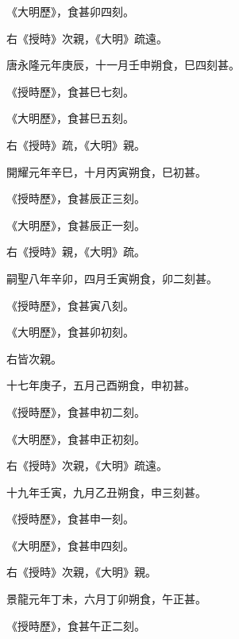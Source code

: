 \begin{pinyinscope}
 《大明歷》，食甚卯四刻。



 右《授時》次親，《大明》疏遠。



 唐永隆元年庚辰，十一月壬申朔食，巳四刻甚。



 《授時歷》，食甚巳七刻。



 《大明歷》，食甚巳五刻。



 右《授時》疏，《大明》親。



 開耀元年辛巳，十月丙寅朔食，巳初甚。



 《授時歷》，食甚辰正三刻。



 《大明歷》，食甚辰正一刻。



 右《授時》親，《大明》疏。



 嗣聖八年辛卯，四月壬寅朔食，卯二刻甚。



 《授時歷》，食甚寅八刻。



 《大明歷》，食甚卯初刻。



 右皆次親。



 十七年庚子，五月己酉朔食，申初甚。



 《授時歷》，食甚申初二刻。



 《大明歷》，食甚申正初刻。



 右《授時》次親，《大明》疏遠。



 十九年壬寅，九月乙丑朔食，申三刻甚。



 《授時歷》，食甚申一刻。



 《大明歷》，食甚申四刻。



 右《授時》次親，《大明》親。



 景龍元年丁未，六月丁卯朔食，午正甚。



 《授時歷》，食甚午正二刻。




\end{pinyinscope}
